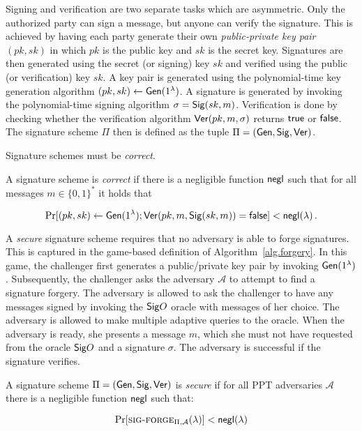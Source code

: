 Signing and verification are two separate tasks which are asymmetric. Only the
authorized party can sign a message, but anyone can verify the signature. This
is achieved by having each party generate their own \emph{public-private
key pair} $(pk, sk)$ in which $pk$ is the public key and $sk$ is the secret key.
Signatures are then generated using the secret (or signing) key $sk$ and
verified using the public (or verification) key $sk$. A key pair is generated
using the polynomial-time key generation algorithm $(pk, sk) \gets
\mathsf{Gen}(1^\lambda)$. A signature is generated by invoking the polynomial-time
signing algorithm $\sigma = \mathsf{Sig}(sk, m)$. Verification is done by checking
whether the verification algorithm $\mathsf{Ver}(pk, m, \sigma)$ returns $\textsf{true}$ or
$\textsf{false}$. The signature scheme $\Pi$ then is defined as the tuple
$\Pi = (\mathsf{Gen}, \mathsf{Sig}, \mathsf{Ver})$.

Signature schemes must be \emph{correct}.

\begin{definition}
  A signature scheme is \emph{correct} if there is a
  negligible function $\mathsf{negl}$ such that for all messages $m \in \{0, 1\}^*$ it
  holds that

  \[
    \Pr[(pk, sk) \gets \mathsf{Gen}(1^\lambda); \mathsf{Ver}(pk, m, \mathsf{Sig}(sk, m)) = \textsf{false}] < \mathsf{negl}(\lambda)\,.
  \]
\end{definition}

A \emph{secure} signature scheme requires that no adversary is able to forge
signatures. This is captured in the game-based definition of Algorithm~\ref{alg.forgery}. In this game, the challenger first generates a public/private key pair by invoking $\mathsf{Gen}(1^\lambda)$. Subsequently, the challenger asks the adversary $\mathcal{A}$ to attempt to find a signature forgery. The adversary is allowed to ask the challenger to have any messages signed by invoking the ${\mathsf{Sig}}O$ oracle with messages of her choice. The adversary is allowed to make multiple adaptive queries to the oracle. When the adversary is ready, she presents a message $m$, which she must not have requested from the oracle ${\mathsf{Sig}}O$ and a signature $\sigma$. The adversary is successful if the signature verifies.



\begin{definition}[Security]
  A signature scheme $\Pi = (\mathsf{Gen}, \mathsf{Sig}, \mathsf{Ver})$ is \emph{secure} if for all PPT adversaries $\mathcal{A}$ there is a negligible function $\mathsf{negl}$ such that:

  \[
  \Pr[\textsc{sig-forge}_{\Pi,\mathcal{A}}(\lambda)] < \mathsf{negl}(\lambda)
  \]
\end{definition}

